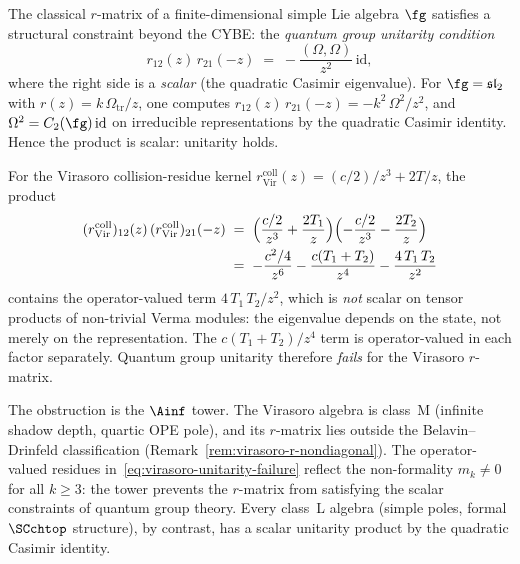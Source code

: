 \begin{remark}
\label{rem:virasoro-qg-unitarity}
The classical $r$-matrix of a finite-dimensional simple Lie
algebra $\fg$ satisfies a structural constraint beyond the CYBE:
the \emph{quantum group unitarity condition}
\begin{equation}\label{eq:qg-unitarity}
 r_{12}(z)\,r_{21}(-z) \;=\; -\frac{(\Omega,\Omega)}{z^2}\,\mathrm{id},
\end{equation}
where the right side is a \emph{scalar} (the quadratic Casimir
eigenvalue). For $\fg = \mathfrak{sl}_2$ with
$r(z) = k\,\Omega_{\mathrm{tr}}/z$, one computes
$r_{12}(z)\,r_{21}(-z) = -k^2\,\Omega^2/z^2$, and
$\Omega^2 = C_2(\fg)\,\mathrm{id}$ on irreducible representations
by the quadratic Casimir identity. Hence the product is scalar:
unitarity holds.

For the Virasoro collision-residue kernel
\(r_{\mathrm{Vir}}^{\mathrm{coll}}(z) = (c/2)/z^3 + 2T/z\), the product
\begin{align}
 (r_{\mathrm{Vir}}^{\mathrm{coll}})_{12}(z)\,
 (r_{\mathrm{Vir}}^{\mathrm{coll}})_{21}(-z)
 &\;=\;
 \Bigl(\frac{c/2}{z^3} + \frac{2T_1}{z}\Bigr)
 \Bigl(-\frac{c/2}{z^3} - \frac{2T_2}{z}\Bigr)
 \notag\\
 &\;=\;
 -\frac{c^2/4}{z^6}
 - \frac{c(T_1 + T_2)}{z^4}
 - \frac{4\,T_1\,T_2}{z^2}
 \label{eq:virasoro-unitarity-failure}
\end{align}
contains the operator-valued term $4\,T_1\,T_2/z^2$, which
is \emph{not} scalar on tensor products of non-trivial Verma
modules: the eigenvalue depends on the state, not merely on
the representation. The $c(T_1 + T_2)/z^4$ term
is operator-valued in each factor separately.
Quantum group unitarity therefore \emph{fails} for the Virasoro
$r$-matrix.

The obstruction is the $\Ainf$ tower. The Virasoro
algebra is class~M (infinite shadow depth, quartic OPE pole),
and its $r$-matrix lies outside the
Belavin--Drinfeld classification
(Remark~\ref{rem:virasoro-r-nondiagonal}). The
operator-valued residues in~\eqref{eq:virasoro-unitarity-failure}
reflect the non-formality
$m_k \ne 0$ for all $k \ge 3$: the tower prevents
the $r$-matrix from satisfying the scalar constraints of
quantum group theory. Every class~L algebra
(simple poles, formal $\SCchtop$ structure), by contrast,
has a scalar
unitarity product by the quadratic Casimir identity.
\end{remark}


